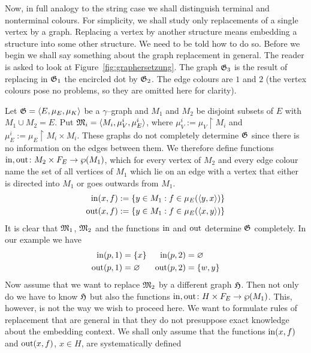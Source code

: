 Now, in full analogy to the string case we shall distinguish
terminal and nonterminal colours. For simplicity, we shall study 
only replacements of a single vertex by a graph. Replacing a vertex 
by another structure means embedding a structure into some other 
structure. We need to be told how to do so. Before 
we begin we shall say something about the graph replacement in 
general. The reader is asked to look at
Figure~\ref{fig:graphersetzung}. The graph $\mathfrak{G}_3$ is the result of 
replacing in $\mathfrak{G}_1$ the encircled dot by $\mathfrak{G}_2$. The edge colours 
are $1$ and $2$ (the vertex colours pose no problems, so they are
omitted here for clarity).

Let $\mathfrak{G} = \langle E, \mu_E, \mu_K\rangle$ be a $\gamma$--graph and
$M_1$ and $M_2$ be disjoint subsets of $E$ with $M_1 \cup M_2 = E$. 
Put $\mathfrak{M}_i = \langle M_i, \mu^i_V, \mu^i_E\rangle$, where 
$\mu^i_V := \mu_V \restriction M_i$ and
$\mu^i_E := \mu_E \restriction M_i \times M_i$.
These graphs do not completely determine $\mathfrak{G}$
since there is no information on the edges between them.
We therefore define functions $\operatorname{in}, \operatorname{out}\colon
M_2 \times F_E \rightarrow \wp(M_1)$, which for every vertex of $M_2$
and every edge colour name the set of all vertices of $M_1$
which lie on an edge with a vertex that either is directed
into $M_1$ or goes outwards from $M_1$.
\begin{subequations}
\begin{align}
\operatorname{in}(x,f) & := \{y \in M_1 : f \in \mu_E(\langle y,x\rangle)\} \\
\operatorname{out}(x,f) & := \{y \in M_1 : f \in \mu_E(\langle x,y\rangle)\}
\end{align}
\end{subequations}
It is clear that $\mathfrak{M}_1$, $\mathfrak{M}_2$ and the functions
$\operatorname{in}$ and $\operatorname{out}$ determine $\mathfrak{G}$ completely.
In our example we have
\begin{align}
\operatorname{in}(p,1) & = \{x\} & \operatorname{in}(p,2) & = \varnothing \\\notag
\operatorname{out}(p,1) & = \varnothing & \operatorname{out}(p,2) & = \{w,y\}
\end{align}
Now assume that we want to replace $\mathfrak{M}_2$ by a different graph
$\mathfrak{H}$. Then not only do we have to know $\mathfrak{H}$  but also the 
functions $\operatorname{in}, \operatorname{out} \colon H \times F_E \rightarrow
\wp(M_1)$. This, however, is not the way we wish to proceed
here. We want to formulate rules of replacement that are
general in that they do not presuppose exact knowledge about the
embedding context. We shall only assume that the functions
$\operatorname{in}(x,f)$ and $\operatorname{out}(x,f)$, $x \in H$, are systematically defined 
